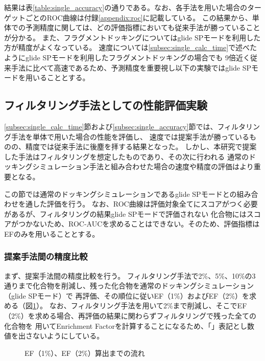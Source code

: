 結果は表\ref{table:single_accuracy}の通りである。なお、各手法を用いた場合のターゲットごとのROC曲線は付録\ref{appendix:roc}に記載している。
この結果から、単体での予測精度に関しては、どの評価指標においても従来手法が勝っていることが分かる。
また、フラグメントドッキングについてはglide SPモードを利用した方が精度がよくなっている。
速度については\ref{subsec:single_calc_time}で述べたようにglide SPモードを利用したフラグメントドッキングの場合でも
9倍近く従来手法に比べて高速であるため、予測精度を重要視し以下の実験ではglide SPモードを用いることとする。

\subsection{フィルタリング手法としての性能評価実験}
\ref{subsec:single_calc_time}節および\ref{subsec:single_accuracy}節では、フィルタリング手法を単体で用いた場合の性能を評価し、
速度では提案手法が勝っているものの、精度では従来手法に後塵を拝する結果となった。
しかし、本研究で提案した手法はフィルタリングを想定したものであり、その次に行われる
通常のドッキングシミュレーション手法と組み合わせた場合の速度や精度の評価はより重要となる。

この節では通常のドッキングシミュレーションであるglide SPモードとの組み合わせを通した評価を行う。
なお、ROC曲線は評価対象全てにスコアがつく必要があるが、フィルタリングの結果glide SPモードで評価されない
化合物にはスコアがつかないため、ROC-AUCを求めることはできない。そのため、評価指標はEFのみを用いることとする。

\subsubsection{提案手法間の精度比較}\label{subsubsec:filtering_proposal}
まず、提案手法間の精度比較を行う。
フィルタリング手法で2\%、5\%、10\%の3通りまで化合物を削減し、残った化合物を通常のドッキングシミュレーション（glide SPモード）で
再評価、その順位に従いEF（1\%）およびEF（2\%）を求める（図\ref{fig:filtering_image}）。
なお、フィルタリング手法を用いて2\%まで削減し、そこでEF（2\%）を求める場合、再評価の結果に関わらずフィルタリングで残った全ての化合物を
用いてEnrichment Factorを計算することになるため、「\textendash」表記とし数値を出さないようにしている。

\begin{figure}[htp]
 \begin{center}
  \caption{EF（1\%）、EF（2\%）算出までの流れ}
  \label{fig:filtering_image}
 \end{center}
\end{figure}

